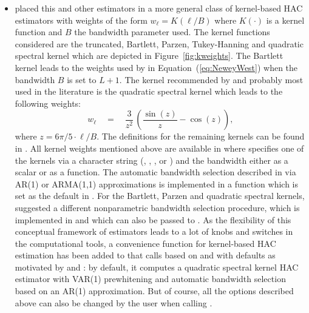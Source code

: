 \documentclass{Z}
\begin{document}
\begin{itemize}
\item \cite{hac:Andrews:1991} placed this and other estimators in a more general class 
of kernel-based HAC estimators with weights of the form $w_\ell = K(\ell/B)$
where $K(\cdot)$ is a kernel function and $B$ the bandwidth parameter used.
The kernel functions considered are the truncated, Bartlett, Parzen, Tukey-Hanning
and quadratic spectral kernel which are depicted in Figure~\ref{fig:kweights}.
The Bartlett kernel leads to the weights used by \cite{hac:Newey+West:1987}
in Equation~(\ref{eq:NeweyWest}) when the bandwidth $B$ is set to $L + 1$.
The kernel recommended by \cite{hac:Andrews:1991} and probably most used in the
literature is the quadratic spectral kernel which leads to the following weights:
\begin{equation}
  w_\ell \quad = \quad \frac{3}{z^2} \, \left(\frac{\sin(z)}{z} - \cos (z) \right),
\end{equation}
where $z = 6 \pi/5 \cdot \ell/B$. The definitions for the remaining kernels can be
found in \cite{hac:Andrews:1991}.
All kernel weights mentioned above are available in 
where  specifies one of the kernels via a character string 
(, , , 
or ) and
 the bandwidth either as a scalar or as a function. The automatic 
bandwidth selection described in \cite{hac:Andrews:1991} via AR(1) or ARMA(1,1)
approximations is implemented in a function  which is set
as the default in . For the Bartlett, Parzen and quadratic
spectral kernels, \cite{hac:Newey+West:1994} suggested a different nonparametric
bandwidth selection procedure, which is implemented in  and
which can also be passed to .
As the flexibility of this conceptual framework
of estimators leads to a lot of knobs and switches in the computational tools,
a convenience function  for kernel-based HAC estimation has been added to  that
calls  based on  and  with defaults
as motivated by \cite{hac:Andrews:1991} and \cite{hac:Andrews+Monahan:1992}:
by default, it computes a quadratic spectral kernel HAC estimator with VAR(1) prewhitening
and automatic bandwidth selection based on an AR(1) approximation. But of course,
all the options described above can also be changed by the user when calling .


\end{itemize}
\end{document}
